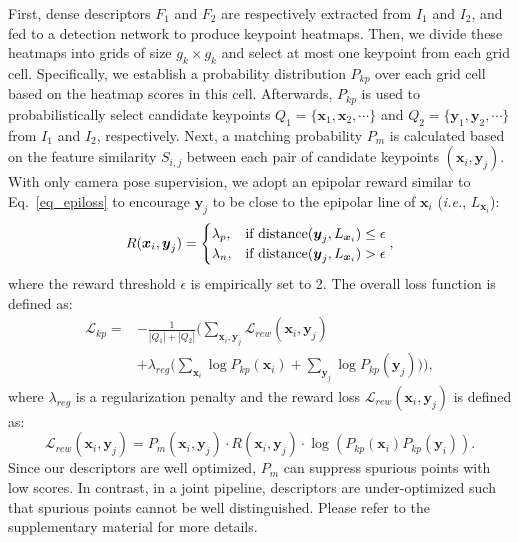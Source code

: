 \documentclass[10pt,twocolumn,letterpaper]{article}
\begin{document}
First, dense descriptors $F_1$ and $F_2$ are respectively extracted from $I_1$ and $I_2$, and fed to a detection network to produce keypoint heatmaps. Then, we divide these heatmaps into grids of size $g_k\times g_k$ and select at most one keypoint from each grid cell. Specifically, we establish a probability distribution $P_{kp}$ over each grid cell based on the heatmap scores in this cell. Afterwards, $P_{kp}$ is used to probabilistically select candidate keypoints $Q_1\!=\!\{ {\boldsymbol{x}_1}, {\boldsymbol{x}_2},\cdots\}$ and $Q_2\!=\!\{ {\boldsymbol{y}_1}, {\boldsymbol{y}_2},\cdots\}$ from $I_1$ and $I_2$, respectively. Next, a matching probability $P_m$ is calculated based on the feature similarity $S_{i,j}$ between each pair of candidate keypoints $(\boldsymbol{x}_i,\boldsymbol{y}_j)$. 
With only camera pose supervision, we adopt an epipolar reward similar to Eq.~\ref{eq_epiloss} to encourage $\boldsymbol{y}_j$ to be close to the epipolar line of $\boldsymbol{x}_i$ (\emph{i.e.}, $L_{\boldsymbol{x}_i}$):
\begin{equation}
    R( \boldsymbol{x}_i, \boldsymbol{y}_j) = 
    \begin{cases} 
    \lambda_p,  & \mbox{if }{\rm distance}( \boldsymbol{y}_j, L_{\boldsymbol{x}_i}) \leq\epsilon \\
    \lambda_n, & \mbox{if }{\rm distance}( \boldsymbol{y}_j,  L_{\boldsymbol{x}_i}) >\epsilon
    \end{cases},
\end{equation}
where the reward threshold $\epsilon$ is empirically set to 2. The overall loss function is defined as: 
\begin{equation}
\begin{split}
    \mathcal{L}_{kp}= &-\frac{1}{|Q_1|+|Q_2|} \Big (\sum_{ \boldsymbol{x}_i, \boldsymbol{y}_j}\mathcal{L}_{rew}( \boldsymbol{x}_i, \boldsymbol{y}_j)\\
    &+ \lambda_{reg}\big(\sum_{\boldsymbol{x}_i} \log P_{kp}( \boldsymbol{x}_i) + \sum_{\boldsymbol{y}_j} \log P_{kp}( \boldsymbol{y}_j)\big) \Big ),
\end{split}
\end{equation}
where $\lambda_{reg}$ is a regularization penalty and the reward loss $\mathcal{L}_{rew}( \boldsymbol{x}_i, \boldsymbol{y}_j)$ is defined as:
\begin{equation}
    \mathcal{L}_{rew}( \boldsymbol{x}_i, \boldsymbol{y}_j) \!=\! P_{m}( \boldsymbol{x}_i, \boldsymbol{y}_j)\cdot R( \boldsymbol{x}_i, \boldsymbol{y}_j) \cdot \log (P_{kp}( \boldsymbol{x}_i)P_{kp}( \boldsymbol{y}_i)).
\end{equation}
Since our descriptors are well optimized, $P_{m}$ can suppress spurious points with low scores. In contrast, in a joint pipeline,  descriptors are under-optimized such that spurious points cannot be well distinguished. Please refer to the supplementary material for more details.
\end{document}
